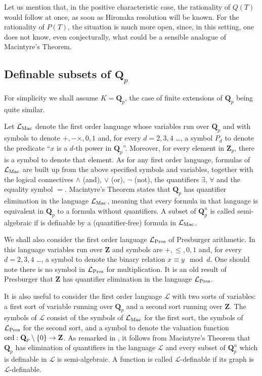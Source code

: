 \documentclass[english,12pt]{amsart}
\def\QQ{{\mathbf Q}}
\def\ZZ{{\mathbf Z}}
\def\cL{{\mathcal L}}
\theoremstyle{definition}
\theoremstyle{remark}
\theoremstyle{plain}
\numberwithin{equation}{subsection}
\def\QQ{{\mathbf Q}}
\def\ZZ{{\mathbf Z}}
\def\cL{{\mathcal L}}
\def\ord{{\rm ord}}
\begin{document}
Let us mention that, in the positive characteristic case, the rationality
of $Q (T)$ would follow at once,  as soon as  Hironaka resolution
will be known. For the rationality 
of $P (T)$, the situation is much more open, since,
in this setting, one does not know, even conjecturally, what
could be a sensible 
analogue of Macintyre's Theorem.

\subsection{Definable subsets of $\QQ_p$}For simplicity we shall
assume $K = \QQ_p$, the case of finite extensions of $\QQ_p$
being quite similar.


Let $\cL_{\rm Mac}$ denote the first order language
whose variables run over $\QQ_p$ and with symbols
to denote $+, - \times, 0, 1$ and, for every $d = 2, 3, 4$ \dots,
a symbol $P_d$ to denote the predicate ``$x$ is a $d$-th power in
$\QQ_p$''. 
Moreover, for every element in $\ZZ_p$,
there is a symbol to denote that element.
As for any first order language, formulas of
$\cL_{\rm Mac}$ are built up from the above specified symbols and variables,
together with 
the logical connectives
$\wedge$ (and), $\vee$ (or), $\neg$ (not), the quantifiers $\exists$,
$\forall$ and the equality symbol $=$.
Macintyre's Theorem \cite{angus} states that $\QQ_p$
has quantifier elimination in the language $\cL_{\rm Mac}$,
meaning that every formula in that language is equivalent in $\QQ_p$
to a formula without quantifiers.
A subset of $\QQ_p^n$ is called semi-algebraic if is definable by a 
(quantifier-free) formula in $\cL_{\rm Mac}$.

We shall also consider the first order language $\cL_{\rm Pres}$
of Presburger arithmetic. In this language variables run over $\ZZ$
and symbols are $+, \leq, 0, 1$ and, for  every $d = 2, 3, 4$ \dots,
a symbol  to denote the binary relation $x \equiv y \mod d$.
One should note there is no symbol in $\cL_{\rm Pres}$ for multiplication.
It is an old result of Presburger that $\ZZ$
has quantifier elimination in the language $\cL_{\rm Pres}$.

It is also useful to consider  the first order language $\cL$
with two sorts of variables: a  first sort of variable running
over $\QQ_p$ and a second sort running over $\ZZ$. The symbols
of
$\cL$ consist of the  symbols of $\cL_{\rm Mac}$ for the first sort,
the  symbols of $\cL_{\rm Pres}$ for the second sort,
and a symbol to denote the valuation function
$\ord : \QQ_p \setminus \{0\} \rightarrow \ZZ$.
As remarked in \cite{denef}, it follows
from Macintyre's Theorem that $\QQ_p$ has elimination 
of quantifiers in the language
$\cL$ and every subset of
$\QQ_p^n$ which is definable in $\cL$ is semi-algebraic.
A function is called $\cL$-definable if its graph is $\cL$-definable.
\end{document}
